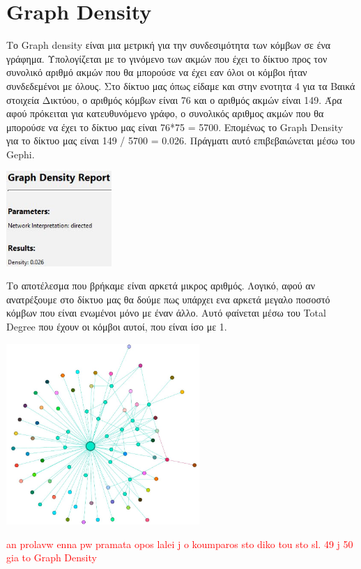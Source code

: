 \documentclass[12pt]{article}
\begin{document}
	\section{Graph Density}
	Το Graph density είναι μια μετρική για την συνδεσιμότητα των κόμβων σε ένα γράφημα. Υπολογίζεται με το γινόμενο των ακμών που έχει το δίκτυο προς τον συνολικό αριθμό ακμών που θα μπορούσε να έχει εαν όλοι οι κόμβοι ήταν συνδεδεμένοι με όλους. Στο δίκτυο μας όπως είδαμε και στην ενοτητα 4 για τα Βαικά στοιχεία Δικτύου, ο αριθμός κόμβων είναι 76 και ο αριθμός ακμών είναι 149. Άρα αφού πρόκειται για κατευθυνόμενο γράφο, ο συνολικός αριθμος ακμών που θα μπορούσε να έχει το δίκτυο μας είναι 76*75 = 5700. Επομένως το Graph Density για το δίκτυο μας είναι 149 / 5700 = 0.026. Πράγματι αυτό επιβεβαιώνεται μέσω του Gephi.
	\begin{center}
		\includegraphics[width=0.3\textwidth]{photos-files/section11/density.JPG}
	\end{center}Το αποτέλεσμα που βρήκαμε είναι αρκετά μικρος αριθμός. Λογικό, αφού αν ανατρέξουμε στο δίκτυο μας θα δούμε πως υπάρχει ενα αρκετά μεγαλο ποσοστό κόμβων που είναι ενωμένοι μόνο με έναν άλλο. Αυτό φαίνεται μέσω του Total Degree που έχουν οι κόμβοι αυτοί, που είναι ίσο με 1.
	\begin{center}
		\includegraphics[width=0.55\textwidth]{photos-files/section11/our_sparse_graph.JPG}
	\end{center}
	
	\textcolor{red}{an prolavw enna pw pramata opos lalei j o koumparos sto diko tou sto sl. 49 j 50 gia to Graph Density}
	\label{chap:graph_density_11}
	
\end{document}
